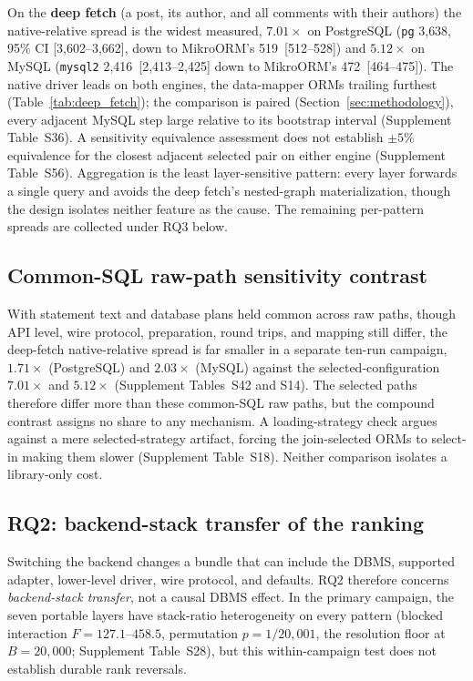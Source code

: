 On the \textbf{deep fetch} (a post, its author, and all comments with their authors) the
native-relative spread is the widest measured, $7.01\times$ on PostgreSQL (\texttt{pg} 3{,}638,
95\% CI [3{,}602--3{,}662], down to MikroORM's 519~[512--528]) and $5.12\times$ on MySQL
(\texttt{mysql2} 2{,}416~[2{,}413--2{,}425] down to MikroORM's 472~[464--475]). The native driver
leads on both engines, the data-mapper ORMs trailing furthest
(Table~\ref{tab:deep_fetch}); the comparison is paired (Section~\ref{sec:methodology}), every
adjacent MySQL step large relative to its bootstrap interval (Supplement Table~S36). A sensitivity
equivalence assessment does not establish $\pm5\%$ equivalence for the closest adjacent selected pair
on either engine (Supplement Table~S56).
Aggregation is
the least layer-sensitive pattern: every layer forwards a single query and avoids the
deep fetch's nested-graph materialization, though the design isolates neither feature as the cause.
The remaining per-pattern spreads are collected under RQ3 below.

\subsection{Common-SQL raw-path sensitivity contrast}
With statement text and database plans held common across raw paths, though API level, wire protocol,
preparation, round trips, and mapping still differ, the deep-fetch native-relative spread is far
smaller in a separate ten-run campaign, $1.71\times$ (PostgreSQL) and $2.03\times$ (MySQL) against
the selected-configuration $7.01\times$ and $5.12\times$ (Supplement Tables~S42 and S14). The
selected paths therefore differ more than these common-SQL raw paths, but the compound contrast
assigns no share to any mechanism. A loading-strategy check argues against a mere selected-strategy
artifact, forcing the join-selected ORMs to select-in making them slower (Supplement Table~S18).
Neither comparison isolates a library-only cost.

\subsection{RQ2: backend-stack transfer of the ranking}
Switching the backend changes a bundle that can include the DBMS, supported adapter,
lower-level driver, wire protocol, and defaults. RQ2 therefore concerns
\emph{backend-stack transfer}, not a causal DBMS effect. In the primary campaign,
the seven portable layers have stack-ratio heterogeneity on every pattern (blocked
interaction $F=127.1$--$458.5$, permutation $p=1/20{,}001$, the resolution floor at $B=20{,}000$; Supplement Table~S28),
but this within-campaign test does not establish durable rank reversals.

